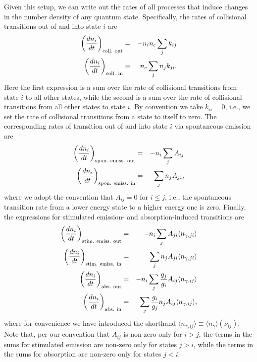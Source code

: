 Given this setup, we can write out the rates of all processes that induce changes in the number density of any quantum state. Specifically, the rates of collisional transitions out of and into state $i$ are
\begin{eqnarray}
\left(\frac{dn_i}{dt}\right)_{\rm coll.~out} & = & -n_i n_c \sum_j k_{ij} \\
\left(\frac{dn_i}{dt}\right)_{\rm coll.~in} & = & n_c \sum_j n_j k_{ji}.
\end{eqnarray}
Here the first expression is a sum over the rate of collisional transitions from state $i$ to all other states, while the second is a sum over the rate of collisional transitions from all other states to state $i$. By convention we take $k_{ii} = 0$, i.e., we set the rate of collisional transitions from a state to itself to zero. The corresponding rates of transition out of and into state $i$ via spontaneous emission are
\begin{eqnarray}
\left(\frac{dn_i}{dt}\right)_{\rm spon.~emiss.~out} & = & -n_i \sum_j A_{ij} \\
\left(\frac{dn_i}{dt}\right)_{\rm spon.~emiss.~in} & = & \sum_j n_j A_{ji},
\end{eqnarray}
where we adopt the convention that $A_{ij} = 0$ for $i \leq j$, i.e., the spontaneous transition rate from a lower energy state to a higher energy one is zero. Finally, the expressions for stimulated emission- and absorption-induced transitions are
\begin{eqnarray}
\left(\frac{dn_i}{dt}\right)_{\rm stim.~emiss.~out} & = & -n_i \sum_j A_{ji} \langle n_{\gamma,ji}\rangle \\
\left(\frac{dn_i}{dt}\right)_{\rm stim.~emiss.~in} & = & \sum_j n_j A_{ji} \langle n_{\gamma,ji}\rangle \\
\left(\frac{dn_i}{dt}\right)_{\rm abs.~out} & = & -n_i \sum_j \frac{g_j}{g_i} A_{ij} \langle n_{\gamma,ij}\rangle \\
\left(\frac{dn_i}{dt}\right)_{\rm abs.~in} & = & \sum_j \frac{g_i}{g_j} n_j A_{ij} \langle n_{\gamma,ij}\rangle,
\end{eqnarray}
where for convenience we have introduced the shorthand $\langle n_{\gamma,ij}\rangle \equiv \langle n_{\gamma}\rangle(\nu_{ij})$. Note that, per our convention that $A_{ij}$ is non-zero only for $i > j$, the terms in the sums for stimulated emission are non-zero only for states $j > i$, while the terms in the sums for absorption are non-zero only for states $j < i$.

